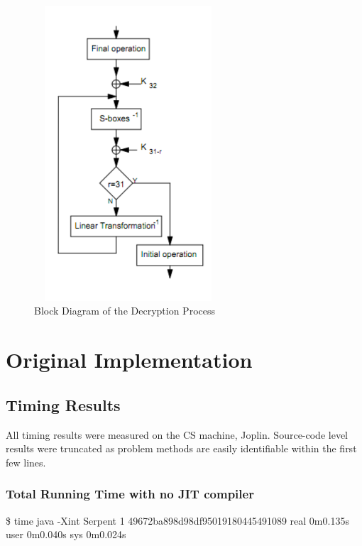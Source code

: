 \documentclass[12pt]{article} %
\begin{document}
\begin{figure}[H]
\centering
\includegraphics[width=7cm,height=11cm]{decrypt}
\caption{Block Diagram of the Decryption Process}
\label{fig:decrypt}
\end{figure}


\section{Original Implementation} %
\subsection{Timing Results}
All timing results were measured on the CS machine, Joplin. Source-code level results were truncated as problem methods are easily identifiable within the first few lines.
\subsubsection{Total Running Time with no JIT compiler}
\$ time java -Xint Serpent 1     
\newline49672ba898d98df95019180445491089
\newline
real	0m0.135s
\newline
user	0m0.040s
\newline
sys	0m0.024s
\vfill
\end{document}

